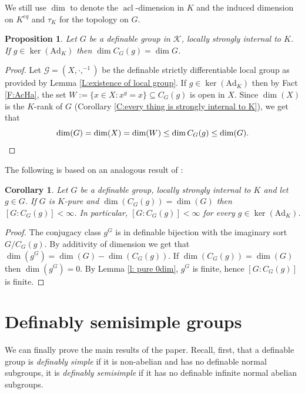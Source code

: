 \documentclass[11pt]{amsart}
\DeclareMathOperator{\acl}{acl}
\newtheorem{corollary}[theorem]{Corollary}
\newtheorem{proposition}[theorem]{Proposition}
\theoremstyle{definition}
\newcommand{\CK}{{\mathcal K}}
\newcommand{\0}{\emptyset}
\newcommand{\ad}{\mathrm{Ad}}
\def\sub{\subseteq}
\begin{document}
We still use $\dim$ to denote the $\acl$-dimension in $K$ and the induced dimension on $K^{eq}$ and $\tau_K$ for the topology on $G$.

\begin{proposition}\label{P:dim C_G(g)=dimG}
    Let $G$ be a definable group in $\CK$, locally strongly internal to $K$. If  $g\in \ker(\ad_K)$ then $\dim C_G(g)=\dim G$.
\end{proposition}
\begin{proof}
    Let $\mathcal{G}=(X,\cdot,^{-1})$ be the definable strictly differentiable local group as provided by Lemma \ref{L:existence of local group}. If $g\in \ker(\ad_K)$ then by Fact \ref{F:AcHa}, the set  $W:=\{x\in X: x^g=x\}\sub C_G(g)$ is open in $X$. Since $\dim (X)$ is  the $K$-rank of $G$ (Corollary \ref{C:every thing is strongly internal to K}), we get that
    \[
    \dim (G)=\dim(X)=\dim (W)\leq \dim C_G(g)\leq \dim(G)
    .\qedhere\]
\end{proof}

The following is based on an analogous result of \cite{GisHalMac}: 

\begin{corollary}\label{C:dugaldetal}
    Let $G$ be a definable group, locally strongly internal to $K$ and let $g\in G$. If $G$ is $K$-pure and $\dim(C_G(g))=\dim(G)$ then $[G:C_G(g)]<\infty$. In particular, $[G:C_G(g)]<\infty$ for every $g\in \ker(\ad_K)$. 
\end{corollary}
\begin{proof}
    The conjugacy class $g^G$ is in definable bijection with the imaginary sort $G/C_G(g)$. By additivity of dimension we get that $\dim(g^G)=\dim(G)-\dim(C_G(g))$. If $\dim(C_G(g))=\dim(G)$ then  $\dim(g^G)=0$.
        By Lemma \ref{l: pure 0dim}, $g^G$ is finite, hence $[G:C_G(g)]$ is finite. 
        \end{proof}
    




\section{Definably semisimple groups}
We can finally prove the main results of the paper. Recall, first,  that a definable group is \emph{definably simple} if it is non-abelian and  has no definable normal subgroups, it is  \emph{definably semisimple} if it has no  definable infinite normal abelian subgroups. 
\end{document}
